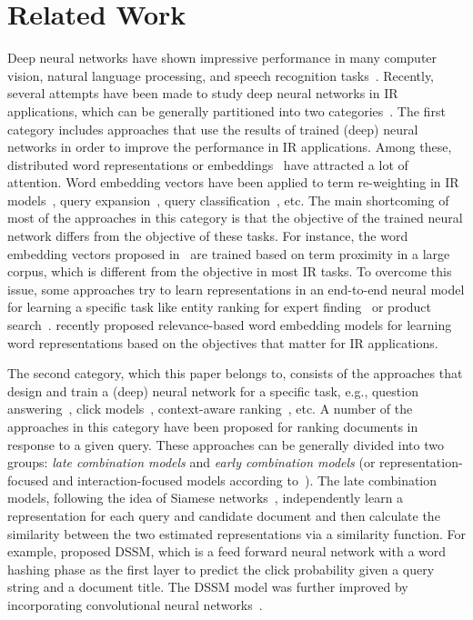 \documentclass[sigconf]{acmart}
\newcommand{\shrink}{\vspace{-1.5ex}}
\begin{document}
\shrink
\section{Related Work}
Deep neural networks have shown impressive performance in many computer vision, natural language processing, and speech recognition tasks~\citep{Lecun:2015}. 
Recently, several attempts have been made to study deep neural networks in IR applications, which can be generally partitioned into two categories~\citep{Onal:2016, Zhang:2016}. 
The first category includes approaches that use the results of trained (deep) neural networks in order to improve the performance in IR applications. Among these, distributed word representations or embeddings~\citep{Mikolov:2013,Pennington:2014} have attracted a lot of attention. Word embedding vectors have been applied to term re-weighting in IR models~\citep{Zheng:2015,Rekabsaz:2017}, query expansion~\citep{Diaz:2016,Zamani:2016a,Rekabsaz:2016}, query classification~\citep{Liu:2015,Zamani:2016b},  etc. 
The main shortcoming of most of the approaches in this category is that the objective of the trained neural network differs from the objective of these tasks.  For instance, the word embedding vectors proposed in~\citep{Mikolov:2013,Pennington:2014} are trained based on term proximity in a large corpus, which is different from the objective in most IR tasks. 
To overcome this issue, some approaches try to learn representations in an end-to-end neural model for learning a specific task like entity ranking for expert finding~\citep{VanGysel:2016:www} or product search~\citep{VanGysel:2016:cikm}. \citet{Zamani:2017} recently proposed relevance-based word embedding models for learning word representations based on the objectives that matter for IR applications.

The second category, which this paper belongs to, consists of the approaches that design and train a (deep) neural network for a specific task, e.g., question answering~\citep{Cohen:2016,Yang:2016}, click models~\citep{Borisov:2016}, context-aware ranking~\citep{Zamani:2017b}, etc.
A number of the approaches in this category have been proposed for ranking documents in response to a given query.
These approaches can be generally divided into two groups: \emph{late combination models} and \emph{early combination models} (or representation-focused and interaction-focused models according to~\citep{Guo:2016}). 
The late combination models, following the idea of Siamese networks~\citep{Bromley:1993}, independently learn a representation for each query and candidate document and then calculate the similarity between the two estimated representations via a similarity function. For example, \citet{Huang:2013} proposed DSSM, which is a feed forward neural network with a word hashing phase as the first layer to predict the click probability given a query string and a document title. 
The DSSM model was further improved by incorporating convolutional neural networks~\citep{Shen:2014}.
\end{document}
